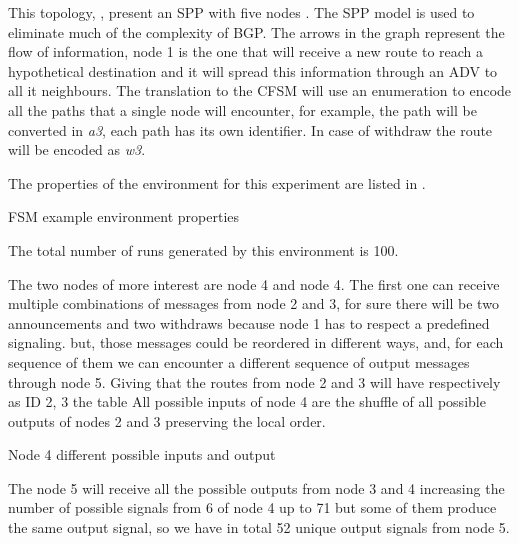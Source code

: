 This topology, , present an \ac{SPP} with five nodes \cite{griffin2002stable}. 
The \ac{SPP} model is used to eliminate much of the complexity of \ac{BGP}.
The arrows in the graph represent the flow of information, node \num{1} is the one
that will receive a new route to reach a hypothetical destination and it will 
spread this information through an \ac{ADV} to all it neighbours.
The translation to the \ac{CFSM} will use an enumeration to encode all the
paths that a single node will encounter, for example, the path  will
be converted in \textit{a3}, each path has its own identifier.
In case of withdraw the route will be encoded as \textit{w3}.

The properties of the environment for this experiment are listed in .

\begin{table}[h]
	
	\caption{FSM example environment properties}
	\label{tbl:fig_4_example}
\end{table}

The total number of runs generated by this environment is \num{100}.

The two nodes of more interest are node \num{4} and node \num{4}.
The first one can receive multiple combinations of messages from node \num{2} and
\num{3}, for sure there will be two announcements and two withdraws because node
1 has to respect a predefined signaling. but, those messages could be reordered
in different ways, and, for each sequence of them we can encounter a different
sequence of output messages through node \num{5}.
Giving that the routes from node \num{2} and \num{3} will have respectively as 
ID \num{2}, \num{3} the table 
All possible inputs of node \num{4} are the shuffle of all possible
outputs of nodes \num{2} and \num{3} preserving the local order.

\begin{table}[h]
	
	\caption{Node 4 different possible inputs and output}
	\label{tbl:fig_4_node4_possible_inputs}
\end{table}

The node \num{5} will receive all the possible outputs from node \num{3} and 
\num{4} increasing the number of possible signals from \num{6} of node \num{4}
up to \num{71} but some of them produce the same output signal, so we have in 
total \num{52} unique output signals from node \num{5}.

